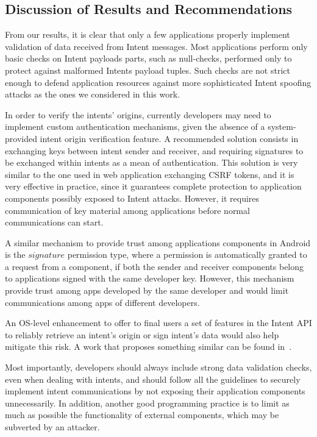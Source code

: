 \subsection{Discussion of Results and Recommendations}

From our results, it is clear that only a few applications properly implement validation of data received from Intent messages. Most applications perform only basic checks on Intent payloads parts, such as null-checks, performed only to protect against malformed Intents payload tuples. Such checks are not strict enough to defend application resources against more sophisticated Intent spoofing attacks as the ones we considered in this work.

In order to verify the intents' origins, currently developers may need to implement custom authentication mechanisms, given the absence of a system-provided intent origin verification feature. A recommended solution consists in exchanging keys between intent sender and receiver, and requiring signatures to be exchanged within intents as a mean of authentication. This solution is very similar to the one used in web application exchanging CSRF tokens, and it is very effective in practice, since it guarantees complete protection to application components possibly exposed to Intent attacks. However, it requires communication of key material among applications before normal communications can start.

{\color{orange}
A similar mechanism to provide trust among applications components in Android is the $signature$ permission type, where a permission is automatically granted to a request from a component, if both the sender and receiver components belong to applications signed with the same developer key. However, this mechanism provide trust among apps developed by the same developer and would limit communications among apps of different developers. 
} 

An OS-level enhancement to offer to final users a set of features
in the Intent API to reliably retrieve an intent's origin or sign intent's data would also help mitigate this risk. A work that proposes something similar can be found in~\cite{quire2011}.

Most importantly, developers should always include strong data validation checks, even when dealing with intents, and should follow all the guidelines to securely implement intent communications by not exposing their application components unnecessarily. { \color{orange} In addition, another good programming practice is to limit as much as possible the functionality of external components, which may be subverted by an attacker. } 


